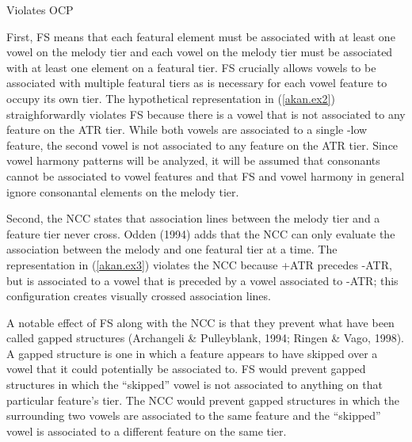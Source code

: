 \documentclass[,doc,floatsintext]{apa6}
\theoremstyle{definition}
\theoremstyle{definition}
\theoremstyle{definition}
\theoremstyle{remark}
\begin{document}
\begin{exe}
\ex \label{akan.ex4} Violates OCP
\end{exe}

First, FS means that each featural element must be associated with at
least one vowel on the melody tier and each vowel on the melody tier
must be associated with at least one element on a featural tier. FS
crucially allows vowels to be associated with multiple featural tiers as
is necessary for each vowel feature to occupy its own tier. The
hypothetical representation in (\ref{akan.ex2}) straighforwardly
violates FS because there is a vowel that is not associated to any
feature on the ATR tier. While both vowels are associated to a single
-low feature, the second vowel is not associated to any feature on the
ATR tier. Since vowel harmony patterns will be analyzed, it will be
assumed that consonants cannot be associated to vowel features and that
FS and vowel harmony in general ignore consonantal elements on the
melody tier.

Second, the NCC states that association lines between the melody tier
and a feature tier never cross. Odden (1994) adds that the NCC can only
evaluate the association between the melody and one featural tier at a
time. The representation in (\ref{akan.ex3}) violates the NCC because
+ATR precedes -ATR, but is associated to a vowel that is preceded by a
vowel associated to -ATR; this configuration creates visually crossed
association lines.

A notable effect of FS along with the NCC is that they prevent what have
been called gapped structures (Archangeli \& Pulleyblank, 1994; Ringen
\& Vago, 1998). A gapped structure is one in which a feature appears to
have skipped over a vowel that it could potentially be associated to. FS
would prevent gapped structures in which the \enquote{skipped} vowel is
not associated to anything on that particular feature's tier. The NCC
would prevent gapped structures in which the surrounding two vowels are
associated to the same feature and the \enquote{skipped} vowel is
associated to a different feature on the same tier.
\end{document}
